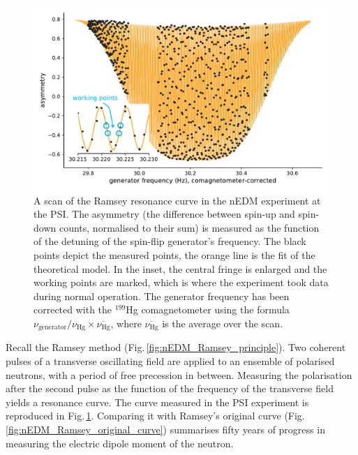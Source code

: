 \begin{figure}
  \centering
  \includegraphics[width=\linewidth]{gfx/nEDMatPSI/ramsey_scan.pdf}
  \caption{A scan of the Ramsey resonance curve in the nEDM experiment at the PSI\@. The asymmetry (the difference between spin-up and spin-down counts, normalised to their sum) is measured as the function of the detuning of the spin-flip generator's frequency. The black points depict the measured points, the orange line is the fit of the theoretical model. In the inset, the central fringe is enlarged and the working points are marked, which is where the experiment took data during normal operation. The generator frequency has been corrected with the $^{199}$Hg comagnetometer using the formula $\nu_\text{generator} / \nu_\text{Hg} \times \overline{\nu_\text{Hg}}$, where $\overline{\nu_\text{Hg}}$ is the average over the scan. }\label{fig:ramsey_scan}
\end{figure}

Recall the Ramsey method (Fig.\,\ref{fig:nEDM_Ramsey_principle}). Two coherent pulses of a transverse oscillating field are applied to an ensemble of polarised neutrons, with a period of free precession in between. Measuring the polarisation after the second pulse as the function of the frequency of the transverse field yields a resonance curve. The curve measured in the PSI experiment is reproduced in Fig.\,\ref{fig:ramsey_scan}. Comparing it with Ramsey's original curve (Fig.\,\ref{fig:nEDM_Ramsey_original_curve}) summarises fifty years of progress in measuring the electric dipole moment of the neutron.

